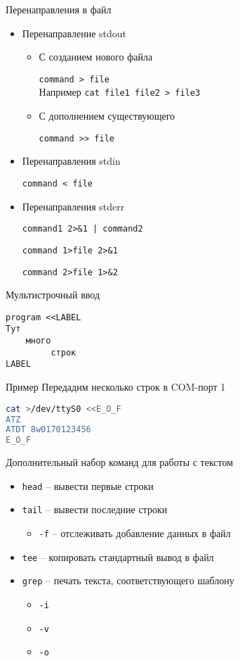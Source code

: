 \begin{frame}{Перенаправления в файл}

\begin{itemize}
  \item Перенаправление stdout 
    \begin{itemize}
      \item С созданием нового файла

        {\tt command > file}\\
		Например {\tt cat file1 file2 > file3}
      \item С дополнением существующего

		  {\tt command >\phantom{}>  file}
    \end{itemize}
    \pause
  \item Перенаправления stdin

    {\tt command < file}
    \pause
  \item Перенаправления stderr

    {\tt command1 2>\&1 | command2}

   {\tt command 1>file 2>\&1}

   {\tt command 2>file 1>\&2}
\end{itemize}

\end{frame}

\begin{frame}[fragile]{Мультистрочный ввод}

\begin{verbatim}
program <<LABEL
Тут
    много
	     строк
LABEL
\end{verbatim}

	\pause
	\begin{block}{Пример}
	Передадим несколько строк в COM-порт 1
\begin{lstlisting}[language=bash]
cat >/dev/ttyS0 <<E_O_F
ATZ
ATDT 8w0170123456
E_O_F
\end{lstlisting}
	\end{block}
\end{frame}

\begin{frame}{Дополнительный набор команд для работы с текстом}
	\begin{itemize}
	  \item {\tt head} -- вывести первые строки
	  \item {\tt tail} -- вывести последние строки
		\begin{itemize}
			\item {\tt -f} -- отслеживать добавление данных в файл 
		\end{itemize}
	  \item {\tt tee} -- копировать стандартный вывод в файл
	  \item {\tt grep} -- печать текста, соответствующего шаблону
		\begin{itemize}
			\item {\tt -i}	
			\item {\tt -v}
			\item {\tt -o}
		\end{itemize}
	\end{itemize}
\end{frame}

